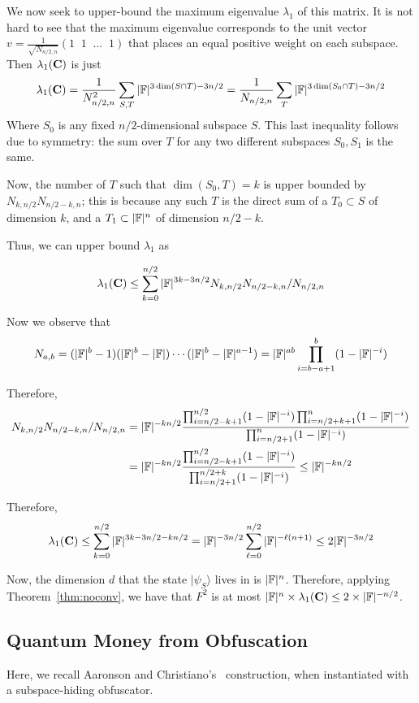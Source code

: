 We now seek to upper-bound the maximum eigenvalue $\lambda_1$ of this matrix.  It is not hard to see that the maximum eigenvalue corresponds to the unit vector $v = \frac{1}{\sqrt{N_{n/2,n}}}(1\;\;1\;\;\dots\;\;1)$ that places an equal positive weight on each subspace.  Then $\lambda_1({\mathbf{C}})$ is just 
\[\lambda_1({\mathbf{C}})=\frac{1}{N_{n/2,n}^2}\sum_{S,T}|{\mathbb F}|^{3\dim(S\cap T)-3n/2}=\frac{1}{N_{n/2,n}}\sum_T |{\mathbb F}|^{3\dim(S_0\cap T)-3n/2}\]
Where $S_0$ is any fixed $n/2$-dimensional subspace $S$.  This last inequality follows due to symmetry: the sum over $T$ for any two different subspaces $S_0,S_1$ is the same.  

Now, the number of $T$ such that $\dim(S_0,T)=k$ is upper bounded by $N_{k,n/2}N_{n/2-k,n}$; this is because any such $T$ is the direct sum of a $T_0\subset S$ of dimension $k$, and a $T_1\subset |{\mathbb F}|^n$ of dimension $n/2-k$.  

Thus, we can upper bound $\lambda_1$ as 

\[\lambda_1({\mathbf{C}})\leq \sum_{k=0}^{n/2} |{\mathbb F}|^{3k-3n/2} N_{k,n/2}N_{n/2-k,n}/N_{n/2,n}\]

Now we observe that \[N_{a,b}=(|{\mathbb F}|^b-1)(|{\mathbb F}|^b-|{\mathbb F}|)\cdots(|{\mathbb F}|^b-|{\mathbb F}|^{a-1})= |{\mathbb F}|^{ab}\prod_{i=b-a+1}^b(1-|{\mathbb F}|^{-i})\]

Therefore, \begin{align*}N_{k,n/2}N_{n/2-k,n}/N_{n/2,n}&=|{\mathbb F}|^{-kn/2}\frac{\prod_{i=n/2-k+1}^{n/2}(1-|{\mathbb F}|^{-i})\prod_{i=n/2+k+1}^{n}(1-|{\mathbb F}|^{-i})}{\prod_{i=n/2+1}^{n}(1-|{\mathbb F}|^{-i})}\\
&=|{\mathbb F}|^{-kn/2}\frac{\prod_{i=n/2-k+1}^{n/2}(1-|{\mathbb F}|^{-i})}{\prod_{i=n/2+1}^{n/2+k}(1-|{\mathbb F}|^{-i})}\leq |{\mathbb F}|^{-kn/2}
\end{align*}

Therefore, \[\lambda_1({\mathbf{C}})\leq \sum_{k=0}^{n/2} |{\mathbb F}|^{3k-3n/2-kn/2}=|{\mathbb F}|^{-3n/2}\sum_{\ell=0}^{n/2}|{\mathbb F}|^{-\ell (n+1)}\leq 2|{\mathbb F}|^{-3n/2}\]

Now, the dimension $d$ that the state $|\psi_S\rangle$ lives in is $|{\mathbb F}|^n$.  Therefore, applying Theorem~\ref{thm:noconv}, we have that $F^2$ is at most $|{\mathbb F}|^n\times \lambda_1({\mathbf{C}})\leq 2\times |{\mathbb F}|^{-n/2}$.

\subsection{Quantum Money from Obfuscation}

Here, we recall Aaronson and Christiano's~\cite{STOC:AarChr12} construction, when instantiated with a subspace-hiding obfuscator.  

